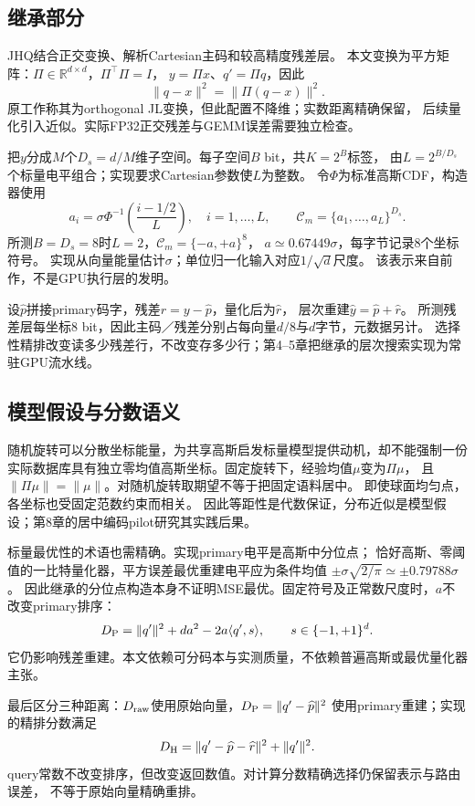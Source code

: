 \subsection{继承部分}
JHQ结合正交变换、解析Cartesian主码和较高精度残差层\cite{jhq}。
本文变换为平方矩阵：$\Pi\in\mathbb R^{d\times d}$，$\Pi^\top\Pi=I$，
$y=\Pi x$、$q'=\Pi q$，因此
\begin{equation}
 \|q-x\|^2=\|\Pi(q-x)\|^2.
 \label{eq:2-isometry}
\end{equation}
原工作称其为orthogonal JL变换，但此配置不降维；实数距离精确保留，
后续量化引入近似。实际FP32正交残差与GEMM误差需要独立检查。

把$y$分成$M$个$D_s=d/M$维子空间。每子空间$B$ bit，共$K=2^B$标签，
由$L=2^{B/D_s}$个标量电平组合；实现要求Cartesian参数使$L$为整数。
令$\Phi$为标准高斯CDF，构造器使用
\begin{equation}
 a_i=\sigma\Phi^{-1}\!\left(\frac{i-1/2}{L}\right),\quad
 i=1,\ldots,L,\qquad
 \mathcal C_m=\{a_1,\ldots,a_L\}^{D_s}.
 \label{eq:2-cartesian}
\end{equation}
所测$B=D_s=8$时$L=2$，$\mathcal C_m=\{-a,+a\}^8$，
$a\simeq0.67449\sigma$，每字节记录8个坐标符号。
实现从向量能量估计$\sigma$；单位归一化输入对应$1/\sqrt d$尺度。
该表示来自前作，不是GPU执行层的发明。

设$\widehat p$拼接primary码字，残差$r=y-\widehat p$，量化后为$\widehat r$，
层次重建$\widehat y=\widehat p+\widehat r$。
所测残差层每坐标8 bit，因此主码／残差分别占每向量$d/8$与$d$字节，元数据另计。
选择性精排改变读多少残差行，不改变存多少行；第4--5章把继承的层次搜索实现为常驻GPU流水线。

\subsection{模型假设与分数语义}
随机旋转可以分散坐标能量，为共享高斯启发标量模型提供动机，却不能强制一份
实际数据库具有独立零均值高斯坐标。固定旋转下，经验均值$\mu$变为$\Pi\mu$，
且$\|\Pi\mu\|=\|\mu\|$。对随机旋转取期望不等于把固定语料居中。
即使球面均匀点，各坐标也受固定范数约束而相关。
因此等距性是代数保证，分布近似是模型假设；第8章的居中编码pilot研究其实践后果。

标量最优性的术语也需精确。实现primary电平是高斯中分位点；
恰好高斯、零阈值的一比特量化器，平方误差最优重建电平应为条件均值
$\pm\sigma\sqrt{2/\pi}\simeq\pm0.79788\sigma$。
因此继承的分位点构造本身不证明MSE最优。固定符号及正常数尺度时，$a$不改变primary排序：
\begin{equation}
 D_{\mathrm{P}}=\|q'\|^2+da^2-2a\langle q',s\rangle,
 \qquad s\in\{-1,+1\}^d.
 \label{eq:2-sign-order}
\end{equation}
它仍影响残差重建。本文依赖可分码本与实测质量，不依赖普遍高斯或最优量化器主张。

最后区分三种距离：$D_{\mathrm{raw}}$使用原始向量，$D_{\mathrm{P}}=\|q'-\widehat p\|^2$
使用primary重建；实现的精排分数满足
\begin{equation}
 D_{\mathrm{H}}=\|q'-\widehat p-\widehat r\|^2+\|q'\|^2.
 \label{eq:2-refined}
\end{equation}
query常数不改变排序，但改变返回数值。对计算分数精确选择仍保留表示与路由误差，
不等于原始向量精确重排。
